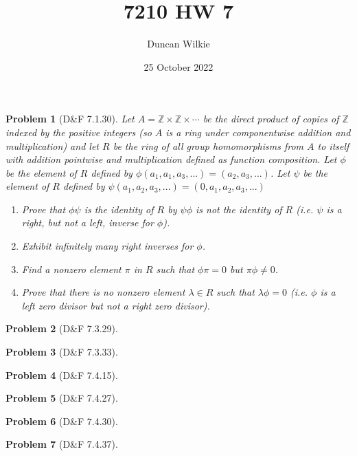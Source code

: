 \documentclass{article}
\title{7210 HW 7}
\author{Duncan Wilkie}
\date{25 October 2022}
\newtheorem{plm}{Problem}
\begin{document}
\maketitle

\begin{plm}[D\&F 7.1.30]
  Let $A = \mathbb{Z} \times \mathbb{Z} \times \cdots$ be the direct product of copies of $\mathbb{Z}$ indexed by the positive integers
  (so $A$ is a ring under componentwise addition and multiplication) and let $R$ be the ring of all group homomorphisms from $A$ to itself
  with addition pointwise and multiplication defined as function composition.
  Let $\phi$ be the element of $R$ defined by $\phi(a_{1}, a_{1}, a_{3}, ...) = (a_{2}, a_{3}, ...)$.
  Let $\psi$ be the element of $R$ defined by $\psi(a_{1}, a_{2}, a_{3}, ...) = (0, a_{1}, a_{2}, a_{3},...)$
  \begin{enumerate}
  \item Prove that $\phi\psi$ is the identity of $R$ by $\psi\phi$ is not the identity of $R$ (i.e. $\psi$ is a right, but not a left, inverse for $\phi$).
  \item Exhibit infinitely many right inverses for $\phi$.
  \item Find a nonzero element $\pi$ in $R$ such that $\phi\pi = 0$ but $\pi\phi \neq 0$.
  \item Prove that there is no nonzero element $\lambda \in R$ such that $\lambda\phi = 0$ (i.e. $\phi$ is a left zero divisor but not a right zero divisor).
  \end{enumerate}
\end{plm}

\begin{plm}[D\&F 7.3.29]

\end{plm}

\begin{plm}[D\&F 7.3.33]

\end{plm}

\begin{plm}[D\&F 7.4.15]

\end{plm}

\begin{plm}[D\&F 7.4.27]

\end{plm}

\begin{plm}[D\&F 7.4.30]

\end{plm}

\begin{plm}[D\&F 7.4.37]

\end{plm}
\end{document}
